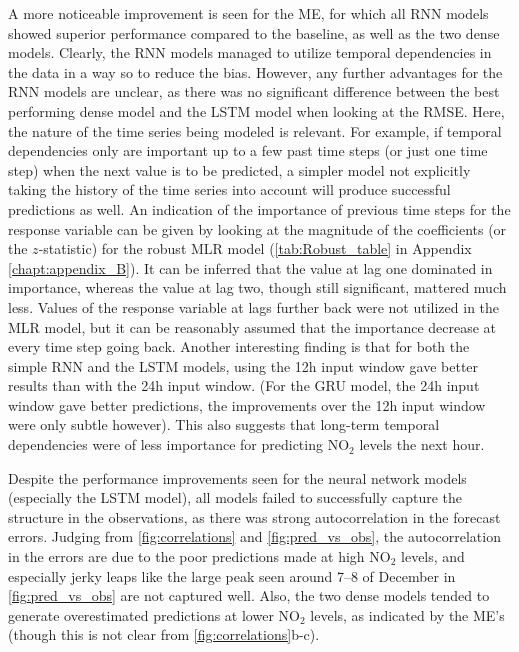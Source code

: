 A more noticeable improvement is seen for the ME, for which all RNN models showed superior performance compared to the baseline, as well as the two dense models. Clearly, the RNN models managed to utilize temporal dependencies in the data in a way so to reduce the bias. However, any further advantages for the RNN models are unclear, as there was no significant difference between the best performing dense model and the LSTM model when looking at the RMSE. Here, the nature of the time series being modeled is relevant. For example, if temporal dependencies only are important up to a few past time steps (or just one time step) when the next value is to be predicted, a simpler model not explicitly taking the history of the time series into account will produce successful predictions as well. An indication of the importance of previous time steps for the response variable can be given by looking at the magnitude of the coefficients (or the $z$-statistic) for the robust MLR model (\cref{tab:Robust_table} in Appendix \ref{chapt:appendix_B}). It can be inferred that the value at lag one dominated in importance, whereas the value at lag two, though still significant, mattered much less. Values of the response variable at lags further back were not utilized in the  MLR model, but it can be reasonably assumed that the importance decrease at every time step going back. Another interesting finding is that for both the simple RNN and the LSTM models, using the 12h input window gave better results than with the 24h input window. (For the GRU model, the 24h input window gave better predictions, the improvements over the 12h input window were only subtle however). This also suggests that long-term temporal dependencies were of less importance for predicting NO$_2$ levels the next hour. 

Despite the performance improvements seen for the neural network models (especially the LSTM model), all models failed to successfully capture the structure in the observations, as there was strong autocorrelation in the forecast errors. Judging from \cref{fig:correlations} and \cref{fig:pred_vs_obs}, the autocorrelation in the errors are due to the poor predictions made at high NO$_2$ levels, and especially jerky leaps like the large peak seen around 7--8 of December in \cref{fig:pred_vs_obs} are not captured well. Also, the two dense models tended to generate overestimated predictions at lower NO$_2$ levels, as indicated by the ME's (though this is not clear from \cref{fig:correlations}b-c).

